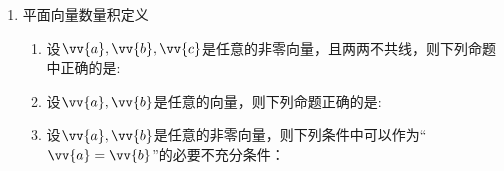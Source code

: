 \begin{enumerate}
\begin{enumerate}
        \begin{jieda}
            根据平面向量平行的充要条件的坐标表示有$sin\alpha \cdot cos\alpha = -\dfrac{\sqrt{3}}{4}$，即$sin2\alpha = -\dfrac{\sqrt{3}}{2}$，又因为$\alpha$为钝角因此$2\alpha \in (\pi, 2\pi)$，故$2\alpha = \dfrac{4\pi}{3}$或$\dfrac{5\pi}{3}$，即$\alpha = \dfrac{2\pi}{3}$或$\dfrac{5\pi}{6}$，又因为$\vv{a}, \vv{b}$不相等，所以有$\alpha = \dfrac{2\pi}{3}$
        \end{jieda}
        \item 若$a > 0$，平面内$A(1, -a), B(2, a^2), C(3, a^3)$三点共线，则$a = $
        \begin{jieda}
            根据坐标关系可知$B$为$AC$中点，因此$2a^2 = a^3 - a$，即$a^2 - 2a - 1 = 0$，解得$a = 1 \pm \sqrt{2}$，因为$a>0$，所以$a = 1+\sqrt{2}$
        \end{jieda}
    \end{enumerate}
    \item 平面向量数量积定义
    \begin{enumerate}
        \item 设$\vv{a}, \vv{b}, \vv{c}$是任意的非零向量，且两两不共线，则下列命题中正确的是:
        \item 设$\vv{a}, \vv{b}$是任意的向量，则下列命题正确的是:
        \item 设$\vv{a}, \vv{b}$是任意的非零向量，则下列条件中可以作为“$\vv{a} = \vv{b}$”的必要不充分条件：
        

\end{enumerate}
\end{enumerate}
